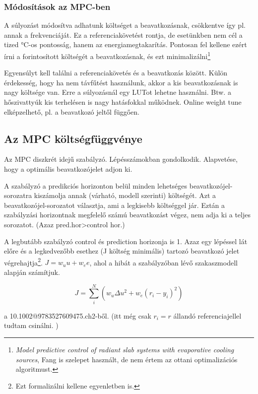 \subsubsection{Módosítások az MPC-ben}

A súlyozást módosítva adhatunk költséget a beavatkozásnak, csökkentve így pl. annak a frekvenciáját. Ez a referenciakövetést rontja, de esetünkben nem cél a tized \si{\celsius}-os pontosság, hanem az energiamegtakarítás.
Pontosan fel kellene ezért írni a forintosított költségét a beavatkozásnak, és ezt minimalizálni\footnote{\textit{Model predictive control of radiant slab systems with evaporative cooling sources}, Fang is szelepet használt, de nem értem az ottani optimalizációs algoritmust.}

Egyensúlyt kell találni a referenciakövetés és a beavatkozás között. Külön érdekesség, hogy ha nem távfűtést használunk, akkor a kis beavatkozásnak is nagy költsége van. Erre a súlyozásnál egy LUTot lehetne használni. Btw. a hőszivattyúk kis terhelésen is nagy hatásfokkal működnek. Online weight tune elképzelhető, pl. a beavatkozó jeltől függően.

\subsection{Az MPC költségfüggvénye}

Az MPC diszkrét idejű szabályzó. Lépésszámokban gondolkodik. Alapvetése, hogy a  optimális beavatkozójelet adjon ki.

A szabályzó a predikciós horizonton belül minden lehetséges beavatkozójel-sorozatra kiszámolja annak (várható, modell szerinti) költségét. Azt a beavatkozójel-sorozatot választja, ami a legkisebb költséggel jár. Eztán a szabályzási horizontnak megfelelő számú beavatkozást végez, nem adja ki a teljes sorozatot. (Azaz pred.hor>control hor.)

A legbutább szabályzó control és prediction horizonja is 1. Azaz egy lépéssel lát előre és a legkedvezőbb esethez (J költség minimális) tartozó beavatkozó jelet végrehajtja\footnote{Ezt formalizálni kellene egyenletben is.}. $J=w_u u + w_e e$, ahol a hibát a szabályzóban lévő szakaszmodell alapján számítjuk. %

\begin{equation} \label{eq_mpc_cost}
J = \sum_{i}^{N} \left(w_u \Delta u^2 + w_e (r_i-y_i)^2  \right)
\end{equation}

a 10.1002@9783527609475.ch2-ből. (itt még csak $r_i=r$ állandó referenciajellel tudtam csinálni. )

